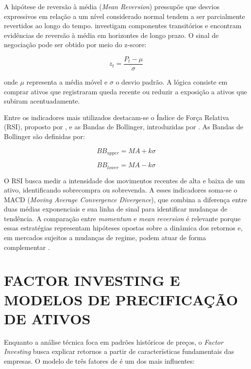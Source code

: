 \documentclass{eic-bcc-tcc}
\begin{document}
A hipótese de reversão à média (\textit{Mean Reversion}) pressupõe que desvios expressivos em relação a um nível considerado normal tendem a ser parcialmente revertidos ao longo do tempo. \citet{PoterbaSummers1988} investigam componentes transitórios e encontram evidências de reversão à média em horizontes de longo prazo. O sinal de negociação pode ser obtido por meio do z-score:

\begin{equation}
z_t = \frac{P_t - \mu}{\sigma}
\end{equation}

onde $\mu$ representa a média móvel e $\sigma$ o desvio padrão. A lógica consiste em comprar ativos que registraram queda recente ou reduzir a exposição a ativos que subiram acentuadamente.

Entre os indicadores mais utilizados destacam-se o Índice de Força Relativa (RSI), proposto por \citet{Wilder1978}, e as Bandas de Bollinger, introduzidas por \citet{Bollinger2001}. As Bandas de Bollinger são definidas por:

\begin{equation}
BB_{upper} = MA + k\sigma
\end{equation}

\begin{equation}
BB_{lower} = MA - k\sigma
\end{equation}

O RSI busca medir a intensidade dos movimentos recentes de alta e baixa de um ativo, identificando sobrecompra ou sobrevenda. A esses indicadores soma-se o MACD (\textit{Moving Average Convergence Divergence}), que combina a diferença entre duas médias exponenciais e sua linha de sinal para identificar mudanças de tendência. A comparação entre \textit{momentum} e \textit{mean reversion} é relevante porque essas estratégias representam hipóteses opostas sobre a dinâmica dos retornos e, em mercados sujeitos a mudanças de regime, podem atuar de forma complementar \citep{JegadeeshTitman1993, PoterbaSummers1988, Moskowitz2012}.

\section{FACTOR INVESTING E MODELOS DE PRECIFICAÇÃO DE ATIVOS}

Enquanto a análise técnica foca em padrões históricos de preços, o \textit{Factor Investing} busca explicar retornos a partir de características fundamentais das empresas. O modelo de três fatores de \citep{FamaFrench1993} é um dos mais influentes:
\end{document}
